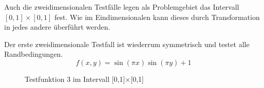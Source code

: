 Auch die zweidimensionalen Testfälle legen als Problemgebiet das Intervall
$[0,1]\times[0,1]$ fest. Wie im Eindimensionalen kann dieses durch Transformation
in jedes andere überführt werden.

Der erste zweidimensionale Testfall ist wiederrum symmetrisch und testet alle
Randbedingungen.
\begin{equation}
f(x,y) = \sin(\pi x) \sin(\pi y) + 1
\end{equation}

\begin{figure}[h]
\centering
\begin{subfigure}[b]{.5\linewidth}
\centering
{}
\end{subfigure}%
\begin{subfigure}[b]{.5\linewidth}
\centering
{}
\end{subfigure}
\caption{Testfunktion 3 im Intervall [0,1]$\times$[0,1]}\label{fig:1}
\end{figure}

